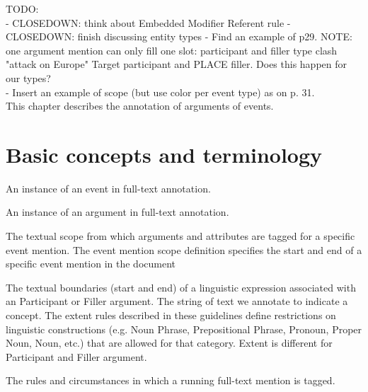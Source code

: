 TODO: \\
- CLOSEDOWN: think about Embedded Modifier Referent rule
- CLOSEDOWN: finish discussing entity types
- Find an example of p29. NOTE: one argument mention can only fill one slot: participant and filler type clash "attack on Europe" Target participant and PLACE filler. Does this happen for our types?\\
- Insert an example of scope (but use color per event type) as on p. 31.\\

This chapter describes the annotation of arguments of events.

\section*{Basic concepts and terminology}
\begin{description}[noitemsep]
    \item[Event mention] An instance of an event in full-text annotation.
    \item[Argument mention] An instance of an argument in full-text annotation.
    \item[Event mention scope] The textual scope from which arguments and attributes are tagged for a specific event mention.
    The event mention scope definition specifies the start and end of a specific event mention in the document 
    \item[Filler argument] 
    \item[Participant argument] 
    \item[Extent] The textual boundaries (start and end) of a linguistic expression associated with an Participant or Filler argument.
    The string of text we annotate to indicate a concept.
    The extent rules described in these guidelines define restrictions on linguistic constructions (e.g. Noun Phrase, Prepositional Phrase, Pronoun, Proper Noun, Noun, etc.) that are allowed for that category.
    Extent is different for Participant and Filler argument.
    \item[Event Role]
    \item[Taggability] The rules and circumstances in which a running full-text mention is tagged.
\end{description}


